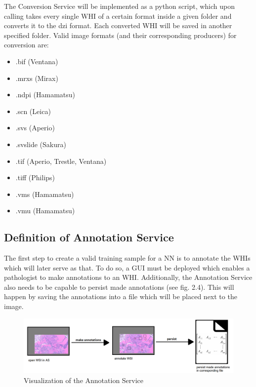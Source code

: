 The Conversion Service will be implemented as a python script, which upon calling takes every single WHI of a certain format inside a given folder and converts it to the dzi format. Each converted WHI will be saved in another specified folder. Valid image formats (and their corresponding producers) for conversion are:

\begin{itemize}
	\item .bif (Ventana)
	\item .mrxs (Mirax)
	\item .ndpi (Hamamatsu)
	\item .scn (Leica)
	\item .svs (Aperio)
	\item .svslide (Sakura)
	\item .tif (Aperio, Trestle, Ventana)
	\item .tiff (Philips)
	\item .vms (Hamamatsu)
	\item .vmu (Hamamatsu)
\end{itemize}


\subsection{Definition of Annotation Service}

The first step to create a valid training sample for a NN is to annotate the WHIs which will later serve as that. To do so, a GUI must be deployed which enables a pathologist to make annotations to an WHI. Additionally, the Annotation Service also needs to be capable to persist made annotations (see fig. 2.4). This will happen by saving the annotations into a file which will be placed next to the image.

\begin{figure}[H]
	\begin{center}
		\includegraphics[scale=0.25]{img/processChainB.png}
		\caption{Visualization of the Annotation Service}
		\label{fig:fig2.4}
	\end{center}
\end{figure}

